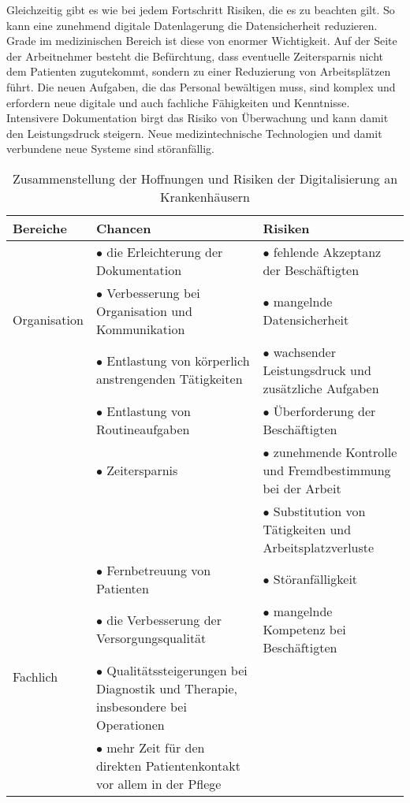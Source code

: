 Gleichzeitig gibt es wie bei jedem Fortschritt Risiken, die es zu beachten gilt. So kann eine zunehmend digitale Datenlagerung die Datensicherheit reduzieren. Grade im medizinischen Bereich ist diese von enormer Wichtigkeit. Auf der Seite der Arbeitnehmer besteht die Befürchtung, dass eventuelle Zeitersparnis nicht dem Patienten zugutekommt, sondern zu einer Reduzierung von Arbeitsplätzen führt. Die neuen Aufgaben, die das Personal bewältigen muss, sind komplex und erfordern neue digitale und auch fachliche Fähigkeiten und Kenntnisse. Intensivere Dokumentation birgt das Risiko von Überwachung und kann damit den Leistungsdruck steigern. Neue medizintechnische Technologien und damit verbundene neue Systeme sind störanfällig. \parencite{braeutigam2017}
\begin{table}[ht]
	\begin{tabular}{l|p{}|p{}}
	\textbf{Bereiche}&\textbf{Chancen}&\textbf{Risiken}\\
	\hline
	\multirow{3}{*}{Organisation}
		&$\bullet$ die Erleichterung der Dokumentation &$\bullet$ fehlende Akzeptanz der Beschäftigten\\
		&$\bullet$ Verbesserung bei Organisation und Kommunikation &$\bullet$ mangelnde Datensicherheit\\
	\hline
	\multirow{7}{*}{Personal}
		&$\bullet$ Entlastung von körperlich anstrengenden Tätigkeiten &$\bullet$ wachsender Leistungsdruck und zusätzliche Aufgaben\\
		&$\bullet$ Entlastung von Routineaufgaben &$\bullet$ Überforderung der Beschäftigten\\
		&$\bullet$ Zeitersparnis&$\bullet$ zunehmende Kontrolle und Fremdbestimmung bei der Arbeit\\
		&&$\bullet$ Substitution von Tätigkeiten und Arbeitsplatzverluste\\
	\hline
	\multirow{6}{*}{Fachlich}
		&$\bullet$ Fernbetreuung von Patienten&$\bullet$ Störanfälligkeit\\
		&$\bullet$ die Verbesserung der Versorgungsqualität &$\bullet$ mangelnde Kompetenz bei Beschäftigten\\
		&$\bullet$ Qualitätssteigerungen bei Diagnostik und Therapie, insbesondere bei Operationen&\\
		&$\bullet$ mehr Zeit für den direkten Patientenkontakt vor allem in der Pflege&\\
	\end{tabular}
	\caption{Zusammenstellung der Hoffnungen und Risiken der Digitalisierung an Krankenhäusern \parencite{braeutigam2017}}
	\label{tab:hoffnung_risiken}
\end{table}\\
